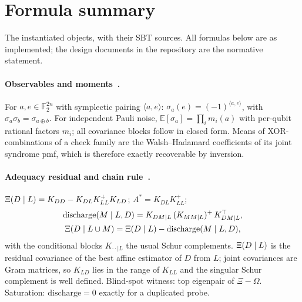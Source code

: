 \section{Formula summary}
\label{app:formulas}

The instantiated objects, with their SBT sources. All formulas below are as implemented; the design documents in the repository are the normative statement.

\paragraph{Observables and moments~\cite{sbt-xi,sbt-f3}.} For $a, e \in \mathbb{F}_2^{2n}$ with symplectic pairing $\langle a, e\rangle$: $\sigma_a(e) = (-1)^{\langle a,e\rangle}$, with $\sigma_a \sigma_b = \sigma_{a \oplus b}$. For independent Pauli noise, $\mathbb{E}[\sigma_a] = \prod_i m_i(a)$ with per-qubit rational factors $m_i$; all covariance blocks follow in closed form. Means of XOR-combinations of a check family are the Walsh--Hadamard coefficients of its joint syndrome pmf, which is therefore exactly recoverable by inversion.

\paragraph{Adequacy residual and chain rule~\cite{sbt-xi}.}
$\Xi(D \mid L) = K_{DD} - K_{DL}K_{LL}^{+}K_{LD}$; \quad $A^{*} = K_{DL}K_{LL}^{+}$;
\begin{gather*}
\mathrm{discharge}(M \mid L, D) = K_{DM|L}\,(K_{MM|L})^{+}\,K_{DM|L}^{\top}, \\
\Xi(D \mid L \cup M) = \Xi(D \mid L) - \mathrm{discharge}(M \mid L, D),
\end{gather*}
with the conditional blocks $K_{\cdot\cdot|L}$ the usual Schur complements. $\Xi(D \mid L)$ is the residual covariance of the best affine estimator of $D$ from $L$; joint covariances are Gram matrices, so $K_{LD}$ lies in the range of $K_{LL}$ and the singular Schur complement is well defined. Blind-spot witness: top eigenpair of $\Xi - \Omega$. Saturation: $\mathrm{discharge} = 0$ exactly for a duplicated probe.

